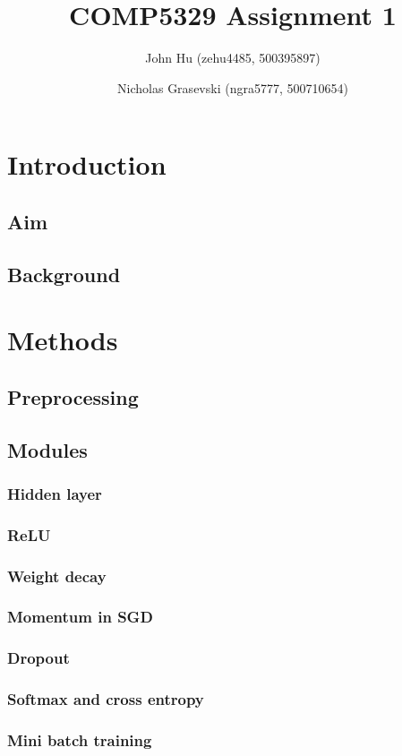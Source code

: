 \documentclass{article}
\title{COMP5329 Assignment 1}
\author{John Hu (zehu4485, 500395897) \and Nicholas Grasevski (ngra5777, 500710654)}
\begin{document}
\maketitle
\begin{abstract}
\end{abstract}

\section{Introduction}
\subsection{Aim}
\subsection{Background}

\section{Methods}
\subsection{Preprocessing}
\subsection{Modules}
\subsubsection{Hidden layer}
\subsubsection{ReLU}
\subsubsection{Weight decay}
\subsubsection{Momentum in SGD}
\subsubsection{Dropout}
\subsubsection{Softmax and cross entropy}
\subsubsection{Mini batch training}
\end{document}
